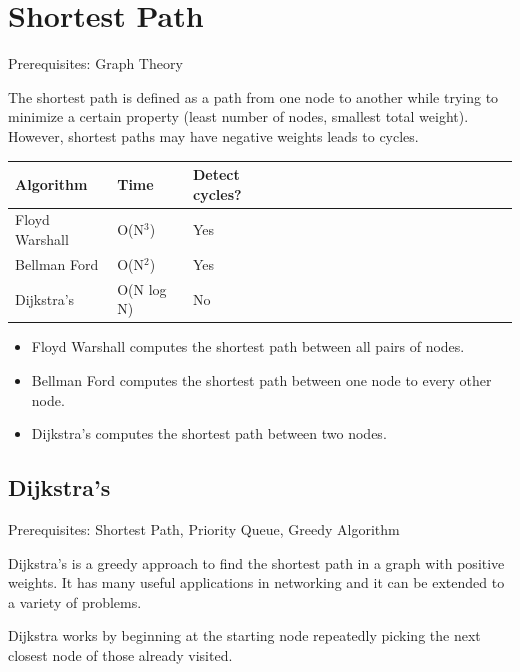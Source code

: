 \documentclass[11pt,oneside]{book}
\begin{document}
    \chapter{ Shortest Path }
        

Prerequisites: Graph Theory

The shortest path is defined as a path from one node to another while trying to minimize a certain property (least number of nodes, smallest total weight). However, shortest paths may have negative weights leads to cycles.


        

\begin{center}\begin{tabulary}{0.4\linewidth}{|l|l|l|l|l|l|l|l|l|l|l|l|l|l|l|l|l|l|l}\hline


  Algorithm &
  Time &
  Detect cycles?\\
\hline


  Floyd Warshall &
  O(N$^{3}$) &
  Yes\\

  Bellman Ford &
  O(N$^{2}$) &
  Yes\\

  Dijkstra's &
  O(N log N) &
  No\\

\hline\end{tabulary}\end{center}

\begin{itemize}
\item Floyd Warshall computes the shortest path between all pairs of nodes.
\item Bellman Ford computes the shortest path between one node to every other node.
\item Dijkstra's computes the shortest path between two nodes.
\end{itemize}

        \section{ Dijkstra's }
        

Prerequisites:  Shortest Path, Priority Queue, Greedy Algorithm

Dijkstra's is a greedy approach to find the shortest path in a graph with positive weights. It has many useful applications in networking and it can be extended to a variety of problems.

Dijkstra works by beginning at the starting node repeatedly picking the next closest node of those already visited.
\end{document}
